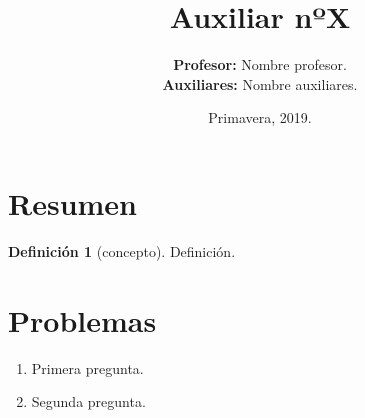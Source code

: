 \documentclass{article}
\title{\bfseries{Auxiliar nºX}}
\author{\textbf{Profesor:} Nombre profesor.\\
	\textbf{Auxiliares:} Nombre auxiliares.}
\date{\small{Primavera, 2019.}}
\theoremstyle{definition}
\newtheorem{defi}{Definición}
\begin{document}
\maketitle

\section*{Resumen}
\begin{defi}[concepto]
	Definición.
\end{defi}


\section*{Problemas}
\begin{enumerate}[{\bf P1.}]
    \item Primera pregunta.
    \item Segunda pregunta.
\end{enumerate}
\end{document}
